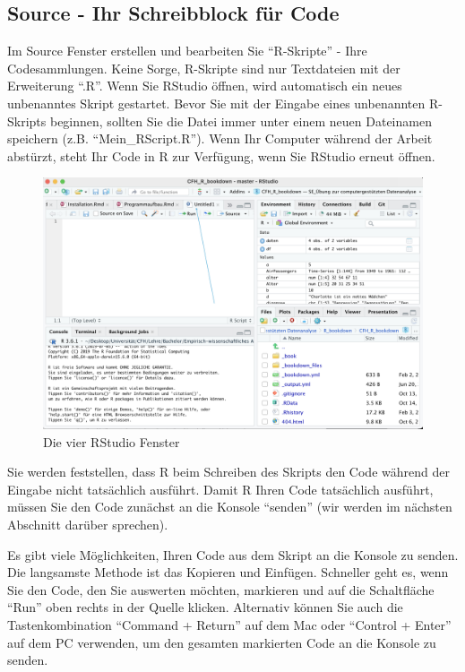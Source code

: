 \documentclass[
]{book}
\begin{document}
\hypertarget{source---ihr-schreibblock-fuxfcr-code}{%
\subsection{Source - Ihr Schreibblock für Code}\label{source---ihr-schreibblock-fuxfcr-code}}

Im Source Fenster erstellen und bearbeiten Sie ``R-Skripte'' - Ihre Codesammlungen. Keine Sorge, R-Skripte sind nur Textdateien mit der Erweiterung ``.R''.
Wenn Sie RStudio öffnen, wird automatisch ein neues unbenanntes Skript gestartet.
Bevor Sie mit der Eingabe eines unbenannten R-Skripts beginnen, sollten Sie die Datei immer unter einem neuen Dateinamen speichern (z.B. ``Mein\_RScript.R'').
Wenn Ihr Computer während der Arbeit abstürzt, steht Ihr Code in R zur Verfügung, wenn Sie RStudio erneut öffnen.

\begin{figure}
\includegraphics[width=28.08in]{images/windows_source} \caption{Die vier RStudio Fenster}\label{fig:unnamed-chunk-2}
\end{figure}

Sie werden feststellen, dass R beim Schreiben des Skripts den Code während der Eingabe nicht tatsächlich ausführt. Damit R Ihren Code tatsächlich ausführt, müssen Sie den Code zunächst an die Konsole ``senden'' (wir werden im nächsten Abschnitt darüber sprechen).

Es gibt viele Möglichkeiten, Ihren Code aus dem Skript an die Konsole zu senden. Die langsamste Methode ist das Kopieren und Einfügen. Schneller geht es, wenn Sie den Code, den Sie auswerten möchten, markieren und auf die Schaltfläche ``Run'' oben rechts in der Quelle klicken. Alternativ können Sie auch die Tastenkombination ``Command + Return'' auf dem Mac oder ``Control + Enter'' auf dem PC verwenden, um den gesamten markierten Code an die Konsole zu senden.
\end{document}
